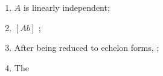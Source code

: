 \begin{enumerate}
\begin{enumerate}
      \item $ A $ is linearly independent;
      
      \item $ \left[ A b \right] $ ;
      
      \item After being reduced to echelon forms, 
      ;
      
      \item The 
    \end{enumerate}
  \end{enumerate}